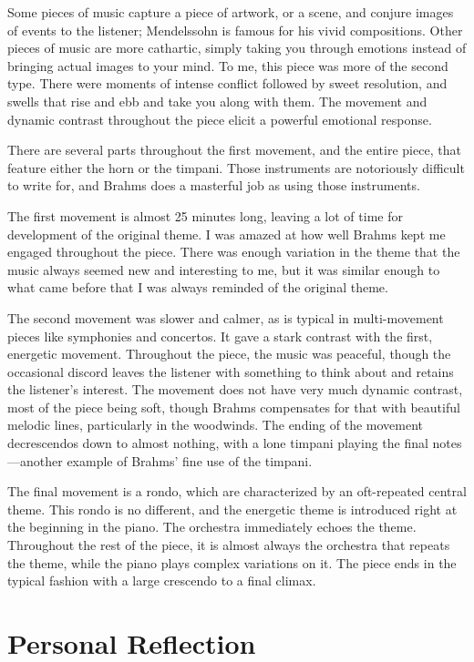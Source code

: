 \documentclass[onecolumn, 12pt]{article}
\begin{document}
Some pieces of music capture a piece of artwork, or a scene, and conjure images
of events to the listener; Mendelssohn is famous for his vivid compositions.
Other pieces of music are more cathartic, simply taking you through emotions
instead of bringing actual images to your mind.  To me, this piece was more of
the second type.  There were moments of intense conflict followed by sweet
resolution, and swells that rise and ebb and take you along with them.  The
movement and dynamic contrast throughout the piece elicit a powerful emotional
response.

There are several parts throughout the first movement, and the entire piece,
that feature either the horn or the timpani.  Those instruments are notoriously
difficult to write for, and Brahms does a masterful job as using those
instruments. 

The first movement is almost 25 minutes long, leaving a lot of time for
development of the original theme.  I was amazed at how well Brahms kept me
engaged throughout the piece.  There was enough variation in the theme that the
music always seemed new and interesting to me, but it was similar enough to
what came before that I was always reminded of the original theme.

The second movement was slower and calmer, as is typical in multi-movement
pieces like symphonies and concertos.  It gave a stark contrast with the first,
energetic movement.  Throughout the piece, the music was peaceful, though the
occasional discord leaves the listener with something to think about and
retains the listener's interest.  The movement does not have very much dynamic
contrast, most of the piece being soft, though Brahms compensates for that with
beautiful melodic lines, particularly in the woodwinds.  The ending of the
movement decrescendos down to almost nothing, with a lone timpani playing the
final notes---another example of Brahms' fine use of the timpani.

The final movement is a rondo, which are characterized by an oft-repeated
central theme.  This rondo is no different, and the energetic theme is
introduced right at the beginning in the piano.  The orchestra immediately
echoes the theme.  Throughout the rest of the piece, it is almost always the
orchestra that repeats the theme, while the piano plays complex variations on
it.  The piece ends in the typical fashion with a large crescendo to a final 
climax.

\section*{Personal Reflection}
\end{document}
